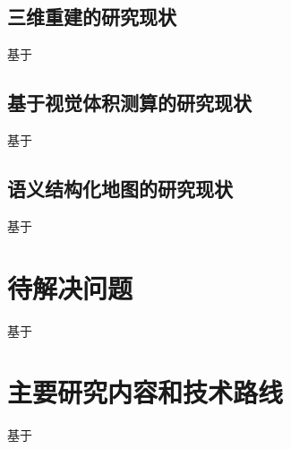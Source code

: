 \subsection{三维重建的研究现状}
\label{sec:1.2.2}
基于
\subsection{基于视觉体积测算的研究现状}
\label{sec:1.2.3}
基于
\subsection{语义结构化地图的研究现状}
\label{sec:1.2.4}
基于
\section{待解决问题}
\label{sec:1.3}
基于
\section{主要研究内容和技术路线}
\label{sec:1.4}
基于
